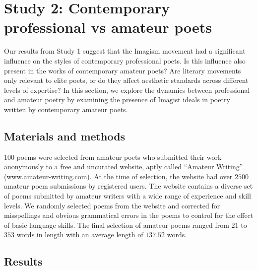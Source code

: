 \documentclass{book}
\begin{document}
\section{Study 2: Contemporary professional vs amateur poets}
Our results from Study 1 suggest that the Imagism movement had a significant influence on the styles of contemporary professional poets. Is this influence also present in the works of contemporary amateur poets? Are literary movements only relevant to elite poets, or do they affect aesthetic standards across different levels of expertise? In this section, we explore the dynamics between professional and amateur poetry by examining the presence of Imagist ideals in poetry written by contemporary amateur poets. 

\subsection{Materials and methods}

$100$ poems were selected from amateur poets who submitted their work anonymously to a free and uncurated website, aptly called ``Amateur Writing'' (www.amateur-writing.com). At the time of selection, the website had over $2500$ amateur poem submissions by registered users. The website contains a diverse set of poems submitted by amateur writers with a wide range of experience and skill levels. We randomly selected poems from the website and corrected for misspellings and obvious grammatical errors in the poems to control for the effect of basic language skills. The final selection of amateur poems ranged from $21$ to $353$ words in length with an average length of $137.52$ words. 


\subsection{Results}
\end{document}
